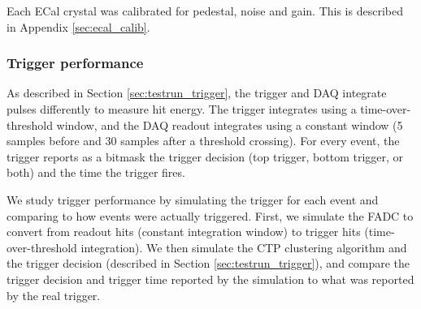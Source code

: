 Each ECal crystal was calibrated for pedestal, noise and gain. This is described in Appendix \ref{sec:ecal_calib}.

\subsubsection{Trigger performance}


As described in Section \ref{sec:testrun_trigger}, the trigger and DAQ integrate pulses differently to measure hit energy. The trigger integrates using a time-over-threshold window, and the DAQ readout integrates using a constant window (5 samples before and 30 samples after a threshold crossing). 
For every event, the trigger reports as a bitmask the trigger decision (top trigger, bottom trigger, or both) and the time the trigger fires.

We study trigger performance by simulating the trigger for each event and comparing to how events were actually triggered.
First, we simulate the FADC to convert from readout hits (constant integration window) to trigger hits (time-over-threshold integration). 
We then simulate the CTP clustering algorithm and the trigger decision (described in Section \ref{sec:testrun_trigger}), and compare the trigger decision and trigger time reported by the simulation to what was reported by the real trigger.

